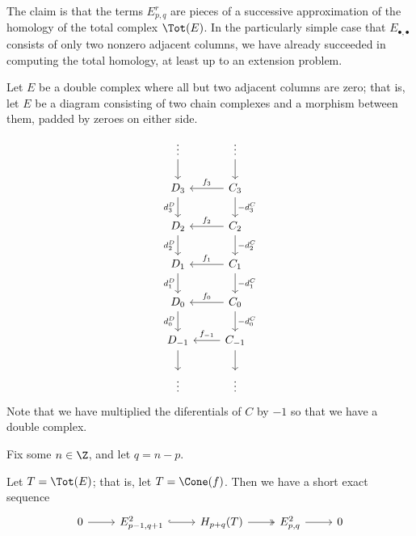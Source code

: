 \documentclass[main.tex]{subfiles}
\begin{document}
The claim is that the terms $E^{r}_{p,q}$ are pieces of a successive approximation of the homology of the total complex $\Tot(E)$. In the particularly simple case that $E_{\bullet,\bullet}$ consists of only two nonzero adjacent columns, we have already succeeded in computing the total homology, at least up to an extension problem.
\begin{proposition}
  Let $E$ be a double complex where all but two adjacent columns are zero; that is, let $E$ be a diagram consisting of two chain complexes and a morphism between them, padded by zeroes on either side.
  \begin{equation*}
    \begin{tikzcd}
      \vdots
      \arrow[d]
      & \vdots
      \arrow[d]
      \\
      D_{3}
      \arrow[d, swap, "d^{D}_{3}"]
      & C_{3}
      \arrow[l, swap, "f_{3}"]
      \arrow[d, "-d^{C}_{3}"]
      \\
      D_{2}
      \arrow[d, swap, "d^{D}_{2}"]
      & C_{2}
      \arrow[l, swap, "f_{2}"]
      \arrow[d, "-d^{C}_{2}"]
      \\
      D_{1}
      \arrow[d, swap, "d^{D}_{1}"]
      & C_{1}
      \arrow[l, swap, "f_{1}"]
      \arrow[d, "-d^{C}_{1}"]
      \\
      D_{0}
      \arrow[d, swap, "d^{D}_{0}"]
      & C_{0}
      \arrow[d, "-d^{C}_{0}"]
      \arrow[l, swap, "f_{0}"]
      \\
      D_{-1}
      \arrow[d]
      & C_{-1}
      \arrow[l, swap, "f_{-1}"]
      \arrow[d]
      \\
      \vdots
      & \vdots
    \end{tikzcd}
  \end{equation*}
  Note that we have multiplied the diferentials of $C$ by $-1$ so that we have a double complex.

  Fix some $n \in \Z$, and let $q = n - p$.

  Let $T = \Tot(E)$; that is, let $T = \Cone(f)$. Then we have a short exact sequence
  \begin{equation*}
    \begin{tikzcd}
      0
      \arrow[r]
      & E^{2}_{p-1,q+1}
      \arrow[r, hook]
      & H_{p+q}(T)
      \arrow[r, two heads]
      & E^{2}_{p,q}
      \arrow[r]
      & 0
    \end{tikzcd}
  \end{equation*}
\end{proposition}
\end{document}
